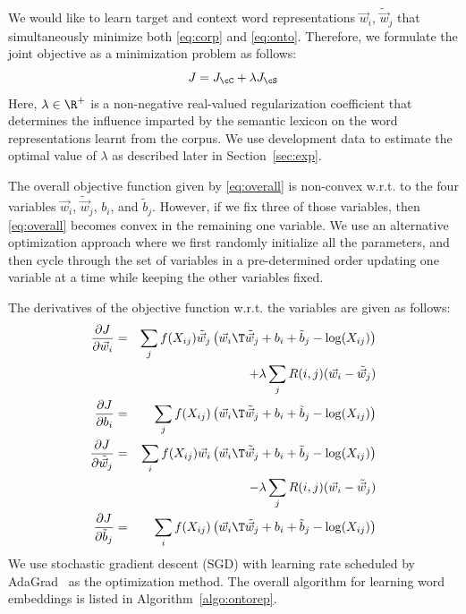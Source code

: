 \documentclass[letterpaper]{article}
\newcommand{\citep}{\cite}
\begin{document}
We would like to learn target and context word representations  $\vec{w}_i$, $\tilde{\vec{w}}_j$
that simultaneously minimize both \eqref{eq:corp} and \eqref{eq:onto}.
Therefore, we formulate the joint objective as a minimization problem as follows:
\begin{equation}
\small
\label{eq:overall}
J = J_{\cC} + \lambda J_{\cS}
\end{equation}
Here, $\lambda \in \R^+$ is a non-negative real-valued regularization coefficient that determines
the influence imparted by the semantic lexicon on the word representations learnt from the corpus.
We use development data to estimate the optimal value of $\lambda$ as described later in Section~\ref{sec:exp}.

The overall objective function given by \eqref{eq:overall} is non-convex w.r.t. to the four variables $\vec{w}_i$, $\tilde{\vec{w}}_j$, $b_i$, and
$\tilde{b}_j$. However, if we fix three of those variables, then \eqref{eq:overall} becomes convex in the remaining one variable.
We use an alternative optimization approach where we first randomly initialize all the parameters, and then cycle through the set of variables
in a pre-determined order updating one variable at a time while keeping the other variables fixed.

The derivatives of the objective function w.r.t. the variables are given as follows:
{\small
\begin{align}
\label{eq:part:wi}
\frac{\partial J}{\partial \vec{w}_i} &=&   \sum_j f(X_{ij}) \tilde{\vec{w}}_j \left(\vec{w}_i\T\tilde{\vec{w}}_j +b_i + \tilde{b}_j  - \log(X_{ij}) \right) \nonumber \\
							   & & + \lambda \sum_j R(i,j) (\vec{w}_i - \tilde{\vec{w}}_j)	\\
\label{eq:part:bi}
\frac{\partial J}{\partial b_i} &=&   \sum_j f(X_{ij}) \left(\vec{w}_i\T\tilde{\vec{w}}_j +b_i + \tilde{b}_j  - \log(X_{ij}) \right) 	\\
\label{eq:part:wj}
\frac{\partial J}{\partial \tilde{\vec{w}}_j} &=&  \sum_i f(X_{ij}) \vec{w}_i \left(\vec{w}_i\T\tilde{\vec{w}}_j +b_i + \tilde{b}_j  - \log(X_{ij}) \right) \nonumber \\
 							   & &	- \lambda \sum_j R(i,j) (\vec{w}_i - \tilde{\vec{w}}_j)	\\
\label{eq:part:bj}
\frac{\partial J}{\partial \tilde{b}_j} &=&   \sum_i f(X_{ij}) \left(\vec{w}_i\T\tilde{\vec{w}}_j +b_i + \tilde{b}_j  - \log(X_{ij}) \right)
\end{align}
}
We use stochastic gradient descent (SGD) with learning rate scheduled by
AdaGrad~\citep{Duchi:JMLR:2011} as the optimization method.
The overall algorithm for learning word embeddings is listed in Algorithm~\ref{algo:ontorep}.
\end{document}
